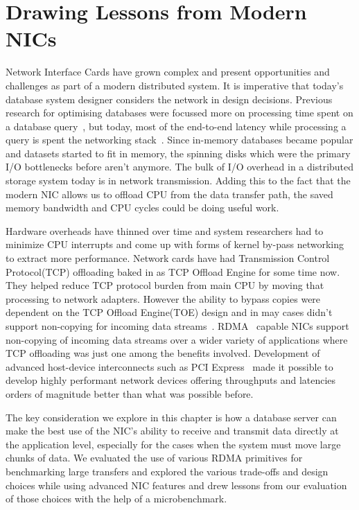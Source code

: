 \chapter{Drawing Lessons from Modern NICs}
\label{chap:modernnics}
Network Interface Cards have grown complex and present opportunities and challenges as part of a modern distributed system.
 It is imperative that today’s database system designer considers the network in design decisions.
 Previous research for optimising databases were focussed more on processing time spent on a database query~\cite{dbmsproctime},
  but today, most of the end-to-end latency while processing a query is spent the networking stack~\cite{ramcloudosr}.
Since in-memory databases became popular and datasets started to fit in memory, the spinning disks 
which were the primary I/O bottlenecks before aren't anymore. The bulk of I/O overhead in a distributed storage system today is in network transmission.
Adding this to the fact that the modern NIC allows us to offload CPU from the data transfer path,
the saved memory bandwidth and CPU cycles could be doing useful work.

Hardware overheads have thinned over time and system researchers had to minimize CPU interrupts and come up with forms of kernel by-pass networking to extract more performance.
 Network cards have had Transmission Control Protocol(TCP) offloading baked in as TCP Offload Engine for some time now. They helped reduce TCP protocol burden from main CPU by moving that processing to network adapters.
 However the ability to bypass copies were dependent on the TCP Offload Engine(TOE) design and in may cases didn't support non-copying for incoming data streams~\cite{tcpoffload}. 
 RDMA~\cite{rdmapatent,rdmacase,rdma} capable NICs support non-copying of incoming data streams over a wider variety of applications where TCP offloading was just one among the benefits involved.
 Development of advanced host-device interconnects such as PCI Express~\cite{pcie}  made it possible to develop highly performant network devices offering throughputs and latencies orders of magnitude better than what was possible before.

 The key consideration we explore in this chapter is how a database server can make the best use of the NIC’s ability to receive and transmit data directly at the application level, especially for the
cases when the system must move large chunks of data. We evaluated
the use of various RDMA primitives for benchmarking large transfers and explored the various
 trade-offs and design choices while using advanced NIC features and drew lessons from our evaluation of those choices with the help of a microbenchmark. 

